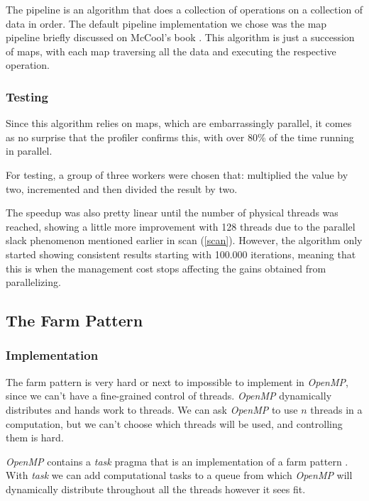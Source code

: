 \documentclass[10pt,journal]{IEEEtran}
\begin{document}
The pipeline is an algorithm that does a collection of operations on a collection of data in order. The default pipeline implementation we chose was the map pipeline briefly discussed on McCool's book \cite{mccool}. This algorithm is just a succession of maps, with each map traversing all the data and executing the respective operation.

\subsubsection{Testing}

Since this algorithm relies on maps, which are embarrassingly parallel, it comes as no surprise that the profiler confirms this, with over 80\% of the time running in parallel.

For testing, a group of three workers were chosen that: multiplied the value by two, incremented and then divided the result by two.

The speedup was also pretty linear until the number of physical threads was reached, showing a little more improvement with 128 threads due to the parallel slack phenomenon mentioned earlier in scan (\ref{scan}). However, the algorithm only started showing consistent results starting with 100.000 iterations, meaning that this is when the management cost stops affecting the gains obtained from parallelizing.

\subsection{The Farm Pattern}
\subsubsection{Implementation}

The farm pattern is very hard or next to impossible to implement in \textit{OpenMP}, since we can't have a fine-grained control of threads. \textit{OpenMP} dynamically distributes and hands work to threads. We can ask \textit{OpenMP} to use $ n $ threads in a computation, but we can't choose which threads will be used, and controlling them is hard.

\textit{OpenMP} contains a \textit{task} pragma that is an implementation of a farm pattern \cite{jlfarm}. With \textit{task} we can add computational tasks to a queue from which \textit{OpenMP} will dynamically distribute throughout all the threads however it sees fit.
\end{document}
